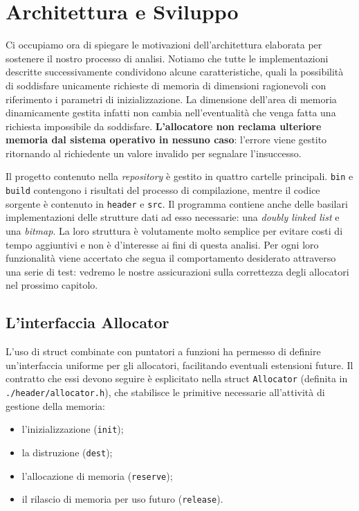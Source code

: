 \chapter{Architettura e Sviluppo}

Ci occupiamo ora di spiegare le motivazioni dell'architettura elaborata per sostenere il nostro processo di analisi. Notiamo che tutte le implementazioni descritte successivamente condividono alcune caratteristiche, quali la possibilità di soddisfare unicamente richieste di memoria di dimensioni ragionevoli con riferimento i parametri di inizializzazione. La dimensione dell’area di memoria dinamicamente gestita infatti non cambia nell’eventualità che venga fatta una richiesta impossibile da soddisfare. \textbf{L’allocatore non reclama ulteriore memoria dal sistema operativo in nessuno caso}: l’errore viene gestito ritornando al richiedente un valore invalido per segnalare l’insuccesso. 

Il progetto contenuto nella \textit{repository} è gestito in quattro cartelle principali. \texttt{bin} e \texttt{build} contengono i risultati del processo di compilazione, mentre il codice sorgente è contenuto in \texttt{header} e \texttt{src}. Il programma contiene anche delle basilari implementazioni delle strutture dati ad esso necessarie: una \textit{doubly linked list} e una \textit{bitmap}. La loro struttura è volutamente molto semplice per evitare costi di tempo aggiuntivi e non è d’interesse ai fini di questa analisi. Per ogni loro funzionalità viene accertato che segua il comportamento desiderato attraverso una serie di test: vedremo le nostre assicurazioni sulla correttezza degli allocatori nel prossimo capitolo.

\section{L’interfaccia Allocator}
L’uso di struct combinate con puntatori a funzioni ha permesso di definire un’interfaccia uniforme per gli allocatori, facilitando eventuali estensioni future. Il contratto che essi devono seguire è esplicitato nella struct \texttt{Allocator} (definita in \texttt{./header/allocator.h}), che stabilisce le primitive necessarie all'attività di gestione della memoria:

\begin{itemize}
    \item l’inizializzazione (\texttt{init});
    \item la distruzione (\texttt{dest});
    \item l’allocazione di memoria (\texttt{reserve});
    \item il rilascio di memoria per uso futuro (\texttt{release}).
\end{itemize}

